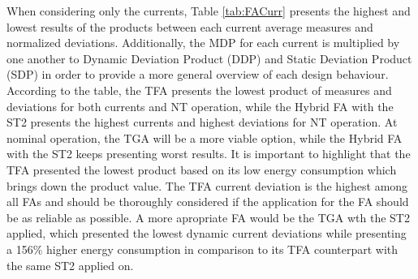 \documentclass[diss,pgmicro,english]{iiufrgs}
\begin{document}
\begin{table}[]
\centering
\caption{Overall results considering the EDP and DPP for each metric and the product between those.}
\label{tab:edpddp}
\end{table}

When considering only the currents, Table \ref{tab:FACurr} presents the highest and lowest results of the products between each current average measures and normalized deviations. Additionally, the MDP for each current is multiplied by one another to Dynamic Deviation Product (DDP) and Static Deviation Product (SDP) in order to provide a more general overview of each design behaviour. According to the table, the TFA presents the lowest product of measures and deviations for both currents and NT operation, while the Hybrid FA with the ST2 presents the highest currents and highest deviations for NT operation. At nominal operation, the TGA will be a more viable option, while the Hybrid FA with the ST2 keeps presenting worst results. It is important to highlight that the TFA presented the lowest product based on its low energy consumption which brings down the product value. The TFA current deviation is the highest among all FAs and should be thoroughly considered if the application for the FA should be as reliable as possible. A more apropriate FA would be the TGA wth the ST2 applied, which presented the lowest dynamic current deviations while presenting a 156\% higher energy consumption in comparison to its TFA counterpart with the same ST2 applied on.
\end{document}
